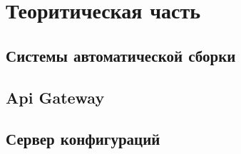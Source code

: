 \chapter[teor]{Теоритическая часть}\label{ch:-}


\section{Системы автоматической сборки}


\section{Api Gateway}


\section{Сервер конфигураций}

